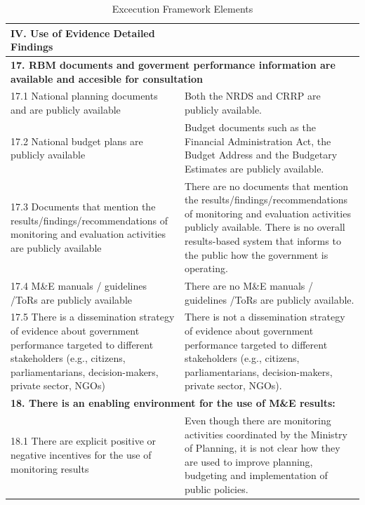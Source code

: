 \documentclass[
  10pt,
]{book}
\begin{document}
\begin{table}

\caption{\label{tab:unnamed-chunk-2}Excecution Framework Elements}
\centering
\begin{tabular}[t]{l|l}
\hline
IV. Use of Evidence Detailed Findings &  \\
\hline
\multicolumn{2}{l}{\textbf{17. RBM documents and goverment performance information are available and accesible for consultation}}\\
\hline
\hspace{1em}17.1 National planning documents and are publicly available & Both the NRDS and CRRP are publicly available.\\
\hline
\hspace{1em}17.2 National budget plans are publicly available & Budget documents such as the Financial Administration Act, the Budget Address and the Budgetary Estimates are publicly available.\\
\hline
\hspace{1em}17.3 Documents that mention the results/findings/recommendations of monitoring and evaluation activities are publicly available & There are no documents that mention the results/findings/recommendations of monitoring and evaluation activities publicly available. There is no overall results-based system that informs to the public how the government is operating.\\
\hline
\hspace{1em}17.4 M\&E manuals / guidelines /ToRs are publicly available & There are no M\&E manuals / guidelines /ToRs are publicly available.\\
\hline
\hspace{1em}17.5 There is a dissemination strategy of evidence about government performance targeted to different stakeholders (e.g., citizens, parliamentarians, decision-makers, private sector, NGOs) & There is not a dissemination strategy of evidence about government performance targeted to different stakeholders (e.g., citizens, parliamentarians, decision-makers, private sector, NGOs).\\
\hline
\multicolumn{2}{l}{\textbf{18. There is an enabling environment for the use of M\&E results:}}\\
\hline
\hspace{1em}18.1 There are explicit positive or negative incentives for the use of monitoring results & Even though there are monitoring activities coordinated by the Ministry of Planning, it is not clear how they are used to improve planning, budgeting and implementation of public policies.\\

\end{tabular}
\end{table}
\end{document}
